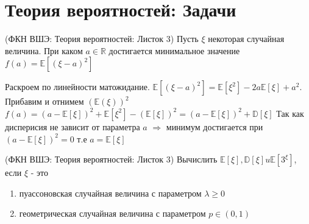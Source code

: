 \section{Теория вероятностей: Задачи}
\begin{problem}{(ФКН ВШЭ: Теория вероятностей: Листок 3)}
	Пусть $ \xi $ некоторая случайная величина. При каком $ a \in \mathbb{R} $ достигается минимальное значение $ f(a) =\mathbb{E}\left[(\xi-a)^{2}\right] $
\end{problem}
\begin{solution}
	Раскроем по линейности матожидание. $ \mathbb{E}\left[(\xi-a)^{2}\right]=\mathbb{E}\left[\xi^{2}\right]-2 a \mathbb{E}[\xi]+a^{2} $.\\
	Прибавим и отнимем $ (\mathbb{E}(\xi))^2 $\\
	
	$f(a)=(a-\mathbb{E}[\xi])^{2}+\mathbb{E}\left[\xi^{2}\right]-(\mathbb{E}[\xi])^{2}=(a-\mathbb{E}[\xi])^{2}+\mathbb{D}[\xi]$
	Так как дисперисия не зависит от параметра $ a $ $ \Rightarrow $ минимум достигается при $ (a-\mathbb{E}[\xi])^{2} = 0 $ т.е $ a =\mathbb{E}[\xi] $
\end{solution}
\begin{problem}{(ФКН ВШЭ: Теория вероятностей: Листок 3)}
	Вычислить $\mathbb{E}[\xi], \mathbb{D}[\xi] u \mathbb{E}\left[3^{\xi}\right]$, если $ \xi $ - это
	\begin{enumerate}
		\item пуассоновская случайная величина с параметром $ \lambda \ge 0 $
		
		\item геометрическая случайная величина с параметром $ p \in (0,1) $
	\end{enumerate}	
\end{problem}

